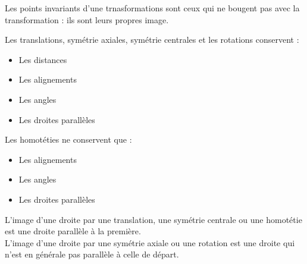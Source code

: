 {Les points invariants d'une trnasformations sont ceux qui ne bougent pas avec la transformation : ils sont leurs propres image.}

{Les translations, symétrie axiales, symétrie centrales et les rotations conservent :
\begin{itemize}
    \item Les distances
    \item Les alignements
    \item Les angles
    \item Les droites parallèles
\end{itemize}
Les homotéties ne conservent que :
\begin{itemize}
    \item Les alignements
    \item Les angles
    \item Les droites parallèles
\end{itemize}
}


{L'image d'une droite par une translation, une symétrie centrale ou une homotétie est une droite parallèle à la première.\\
L'image d'une droite par une symétrie axiale ou une rotation est une droite qui n'est en générale pas parallèle à celle de départ.}

